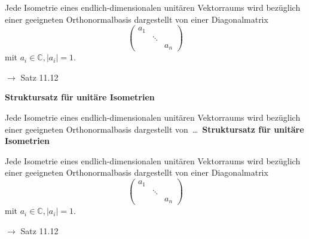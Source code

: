 \documentclass[11pt]{article}
\renewcommand{\cite}[1]{\par\bigskip\hfill{\color{gray}\tiny\(\to\) #1}}
\newcommand{\CC}{\mathbb{C}}
\let\olddots\dots
\renewcommand{\dots}{\,\olddots\,}
\newenvironment{field}{}{\newpage}
\newif\ifnote
\newenvironment{note}{\notetrue}{\notefalse}
\newcommand{\localtag}{}
\newcommand{\globaltag}{}
\newcommand{\tags}[1]{
    \ifnote
        \renewcommand{\localtag}{#1}
    \else
        \renewcommand{\globaltag}{#1}
    \fi
    }
\begin{document}
\begin{note}
\begin{field}
        Jede Isometrie eines endlich-dimensionalen unitären Vektorraums wird bezüglich einer geeigneten Orthonormalbasis dargestellt von einer Diagonalmatrix
        \[\begin{pmatrix}
             a_1 \\
            &\ddots\\
            &&a_n
        \end{pmatrix}\]
        mit $a_i \in \CC, \vert a_i \vert = 1$.
        \cite{Satz 11.12}
    \end{field}

    \begin{field}
        \textbf{Struktursatz für unitäre Isometrien}

        Jede Isometrie eines endlich-dimensionalen unitären Vektorraums wird bezüglich einer geeigneten Orthonormalbasis dargestellt von \dots
    \end{field}
    \begin{field}
        \textbf{Struktursatz für unitäre Isometrien}

        Jede Isometrie eines endlich-dimensionalen unitären Vektorraums wird bezüglich einer geeigneten Orthonormalbasis dargestellt von einer Diagonalmatrix
        \[\begin{pmatrix}
             a_1 \\
            &\ddots\\
            &&a_n
        \end{pmatrix}\]
        mit $a_i \in \CC, \vert a_i \vert = 1$.
        \cite{Satz 11.12}
    \end{field}
\end{note}

\tags{LinA-II-12-Hauptachsentransformation}
\end{document}
